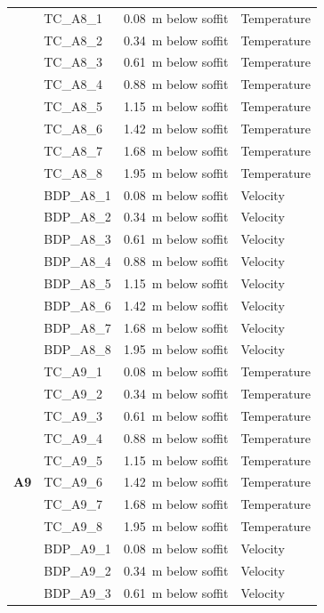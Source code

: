 \documentclass[12pt,oneside]{book}
\begin{document}
\begin{longtable}[c]{c|lll}
\bottomrule
\newpage
\multirow{16}{*}{\large{\textbf{A8}}}
 & TC\_A8\_1  & 0.08~m below soffit  & Temperature \\
 & TC\_A8\_2  & 0.34~m below soffit  & Temperature \\
 & TC\_A8\_3  & 0.61~m below soffit  & Temperature \\
 & TC\_A8\_4  & 0.88~m below soffit  & Temperature \\
 & TC\_A8\_5  & 1.15~m below soffit  & Temperature \\
 & TC\_A8\_6  & 1.42~m below soffit  & Temperature \\
 & TC\_A8\_7  & 1.68~m below soffit  & Temperature \\
 & TC\_A8\_8  & 1.95~m below soffit  & Temperature \\
\cline{2-4}
 & BDP\_A8\_1 & 0.08~m below soffit  & Velocity \\
 & BDP\_A8\_2 & 0.34~m below soffit  & Velocity \\
 & BDP\_A8\_3 & 0.61~m below soffit  & Velocity \\
 & BDP\_A8\_4 & 0.88~m below soffit  & Velocity \\
 & BDP\_A8\_5 & 1.15~m below soffit  & Velocity \\
 & BDP\_A8\_6 & 1.42~m below soffit  & Velocity \\
 & BDP\_A8\_7 & 1.68~m below soffit  & Velocity \\
 & BDP\_A8\_8 & 1.95~m below soffit  & Velocity \\
\midrule
\multirow{16}{*}{\large{\textbf{A9}}}
 & TC\_A9\_1  & 0.08~m below soffit  & Temperature \\
 & TC\_A9\_2  & 0.34~m below soffit  & Temperature \\
 & TC\_A9\_3  & 0.61~m below soffit  & Temperature \\
 & TC\_A9\_4  & 0.88~m below soffit  & Temperature \\
 & TC\_A9\_5  & 1.15~m below soffit  & Temperature \\
 & TC\_A9\_6  & 1.42~m below soffit  & Temperature \\
 & TC\_A9\_7  & 1.68~m below soffit  & Temperature \\
 & TC\_A9\_8  & 1.95~m below soffit  & Temperature \\
\cline{2-4}
 & BDP\_A9\_1 & 0.08~m below soffit  & Velocity \\
 & BDP\_A9\_2 & 0.34~m below soffit  & Velocity \\
 & BDP\_A9\_3 & 0.61~m below soffit  & Velocity \\

\end{longtable}
\end{document}
